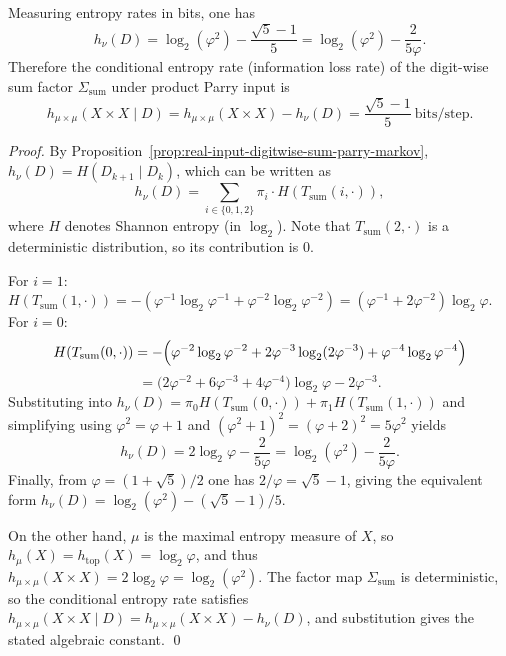 \begin{proposition}\label{prop:real-input-digitwise-sum-information-loss-rate}
Measuring entropy rates in bits, one has
\[
h_\nu(D)=\log_2(\varphi^2)-\frac{\sqrt5-1}{5}
=\log_2(\varphi^2)-\frac{2}{5\varphi}.
\]
Therefore the conditional entropy rate (information loss rate) of the digit-wise sum factor $\Sigma_{\mathrm{sum}}$ under product Parry input is
\[
h_{\mu\times\mu}(X\times X\mid D)
=h_{\mu\times\mu}(X\times X)-h_\nu(D)
=\frac{\sqrt5-1}{5}\ \text{bits/step}.
\]
\end{proposition}

\begin{proof}
By Proposition~\ref{prop:real-input-digitwise-sum-parry-markov}, $h_\nu(D)=H(D_{k+1}\mid D_k)$, which can be written as
\[
h_\nu(D)=\sum_{i\in\{0,1,2\}}\pi_i\cdot H\!\left(T_{\mathrm{sum}}(i,\cdot)\right),
\]
where $H$ denotes Shannon entropy (in $\log_2$).
Note that $T_{\mathrm{sum}}(2,\cdot)$ is a deterministic distribution, so its contribution is $0$.

For $i=1$:
\(
H(T_{\mathrm{sum}}(1,\cdot))=-(\varphi^{-1}\log_2\varphi^{-1}+\varphi^{-2}\log_2\varphi^{-2})
=(\varphi^{-1}+2\varphi^{-2})\log_2\varphi
\).
For $i=0$:
\[
H(T_{\mathrm{sum}}(0,\cdot))
=-\Bigl(\varphi^{-2}\log_2\varphi^{-2}+2\varphi^{-3}\log_2(2\varphi^{-3})+\varphi^{-4}\log_2\varphi^{-4}\Bigr)
\]
\[
=\bigl(2\varphi^{-2}+6\varphi^{-3}+4\varphi^{-4}\bigr)\log_2\varphi-2\varphi^{-3}.
\]
Substituting into $h_\nu(D)=\pi_0H(T_{\mathrm{sum}}(0,\cdot))+\pi_1H(T_{\mathrm{sum}}(1,\cdot))$
and simplifying using $\varphi^2=\varphi+1$ and
\(
(\varphi^2+1)^2=(\varphi+2)^2=5\varphi^2
\)
yields
\[
h_\nu(D)=2\log_2\varphi-\frac{2}{5\varphi}
=\log_2(\varphi^2)-\frac{2}{5\varphi}.
\]
Finally, from $\varphi=(1+\sqrt5)/2$ one has $2/\varphi=\sqrt5-1$, giving the equivalent form
\(
h_\nu(D)=\log_2(\varphi^2)-(\sqrt5-1)/5
\).

On the other hand, $\mu$ is the maximal entropy measure of $X$, so $h_\mu(X)=h_{\mathrm{top}}(X)=\log_2\varphi$, and thus
\(
h_{\mu\times\mu}(X\times X)=2\log_2\varphi=\log_2(\varphi^2)
\).
The factor map $\Sigma_{\mathrm{sum}}$ is deterministic, so the conditional entropy rate satisfies
\(
h_{\mu\times\mu}(X\times X\mid D)=h_{\mu\times\mu}(X\times X)-h_\nu(D)
\), and substitution gives the stated algebraic constant. \qed
\end{proof}

